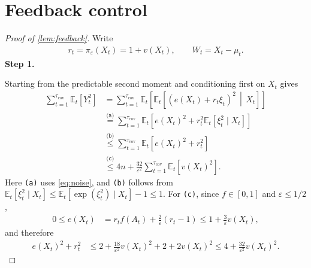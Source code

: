 \documentclass[11pt]{article}
\newcommand{\proofstepinline}[1]{%
    {\sffamily\bfseries\color{blue!55!black}Step #1.}\enspace
}
\newcommand{\E}{\mathbb E}
\newcommand{\1}{\mathbf 1}
\newcommand{\eps}{\varepsilon}
\begin{document}
\section{Feedback control}
\label{app:feedback}
\begin{proof}[Proof of \cref{lem:feedback}]
    Write
    \begin{align}
        r_t=\pi_\eps(X_t)=1+v(X_t),
        \qquad
        W_t=X_t-\mu_t.
    \end{align}
    \proofstepinline{1}
    Starting from the predictable second moment and conditioning first on
    $X_t$ gives
    \begin{align}
        \sum_{t=1}^{\tau_{\mathrm{cov}}}\E_t[Y_t^2]
         & =
        \sum_{t=1}^{\tau_{\mathrm{cov}}}
        \E_t\left[
            \E_t\left[
                \left(e(X_t)+r_t\xi_t\right)^2
                \,\middle|\,X_t
                \right]
            \right]
        \nonumber                        \\
         & \stackrel{\texttt{(a)}}{=}
        \sum_{t=1}^{\tau_{\mathrm{cov}}}
        \E_t\left[
            e(X_t)^2
            +
            r_t^2\E_t[\xi_t^2\mid X_t]
            \right]
        \nonumber                        \\
         & \stackrel{\texttt{(b)}}{\leq}
        \sum_{t=1}^{\tau_{\mathrm{cov}}}
        \E_t\left[
            e(X_t)^2+r_t^2
            \right]
        \nonumber                        \\
         & \stackrel{\texttt{(c)}}{\leq}
        4n
        +
        \frac{32}{\eps^2}
        \sum_{t=1}^{\tau_{\mathrm{cov}}}
        \E_t[v(X_t)^2].
        \label{eq:feedback-start}
    \end{align}
    Here \texttt{(a)} uses \eqref{eq:noise},
    and \texttt{(b)} follows from
    $\E_t[\xi_t^2\mid X_t]
        \leq
        \E_t[\exp(\xi_t^2)\mid X_t]-1
        \leq1$.
    For \texttt{(c)}, since $f\in[0,1]$ and $\eps\leq1/2$,
    \begin{align}
        0\leq e(X_t)
         & =
        r_tf(A_t)+\frac2\eps(r_t-1)
        \leq
        1+\frac3\eps v(X_t),
    \end{align}
    and therefore
    \begin{align}
        e(X_t)^2+r_t^2
         & \leq
        2+\frac{18}{\eps^2}v(X_t)^2
        +2+2v(X_t)^2
        \leq
        4+\frac{32}{\eps^2}v(X_t)^2.
    \end{align}


\end{proof}
\end{document}
